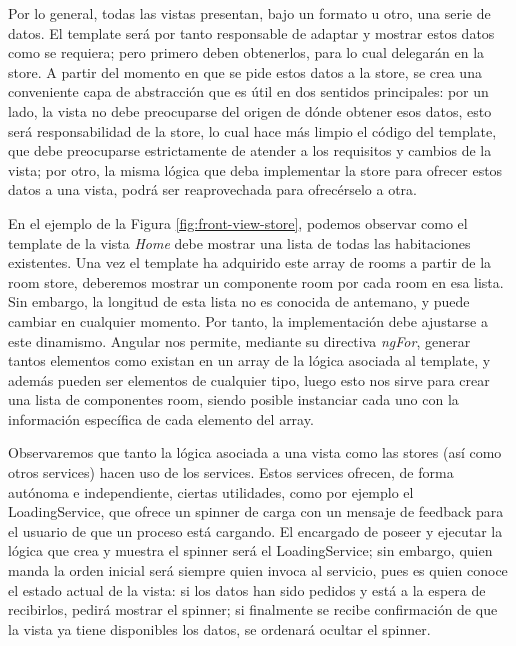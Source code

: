 \vspace{0.5cm}

Por lo general, todas las vistas presentan, bajo un formato u otro, una serie de datos. El template será por tanto responsable de adaptar y mostrar estos datos como se requiera; pero primero deben obtenerlos, para lo cual delegarán en la store. A partir del momento en que se pide estos datos a la store, se crea una conveniente capa de abstracción que es útil en dos sentidos principales: por un lado, la vista no debe preocuparse del origen de dónde obtener esos datos, esto será responsabilidad de la store, lo cual hace más limpio el código del template, que debe preocuparse estrictamente de atender a los requisitos y cambios de la vista; por otro, la misma lógica que deba implementar la store para ofrecer estos datos a una vista, podrá ser reaprovechada para ofrecérselo a otra. 

\vspace{1cm}

En el ejemplo de la Figura \ref{fig:front-view-store}, podemos observar como el template de la vista \textit{Home} debe mostrar una lista de todas las habitaciones existentes. Una vez el template ha adquirido este array de rooms a partir de la room store, deberemos mostrar un componente room por cada room en esa lista. Sin embargo, la longitud de esta lista no es conocida de antemano, y puede cambiar en cualquier momento. Por tanto, la implementación debe ajustarse a este dinamismo. Angular nos permite, mediante su directiva \textit{ngFor}, generar tantos elementos como existan en un array de la lógica asociada al template, y además pueden ser elementos de cualquier tipo, luego esto nos sirve para crear una lista de componentes room, siendo posible instanciar cada uno con la información específica de cada elemento del array.

\vspace{1cm}

Observaremos que tanto la lógica asociada a una vista como las stores (así como otros services) hacen uso de los services. Estos services ofrecen, de forma autónoma e independiente, ciertas utilidades, como por ejemplo el LoadingService, que ofrece un spinner de carga con un mensaje de feedback para el usuario de que un proceso está cargando. El encargado de poseer y ejecutar la lógica que crea y muestra el spinner será el LoadingService; sin embargo, quien manda la orden inicial será siempre quien invoca al servicio, pues es quien conoce el estado actual de la vista: si los datos han sido pedidos y está a la espera de recibirlos, pedirá mostrar el spinner; si finalmente se recibe confirmación de que la vista ya tiene disponibles los datos, se ordenará ocultar el spinner. 


